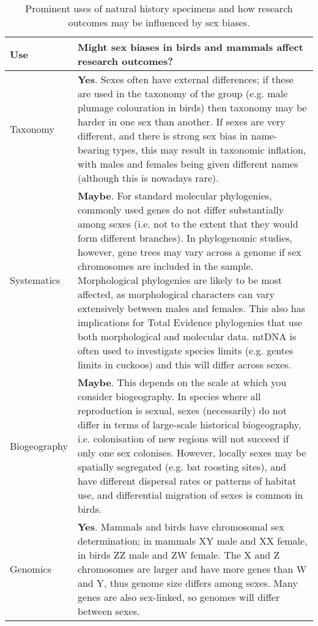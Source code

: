
\begin{longtable}{p{3cm} p{16cm}}

\caption{Prominent uses of natural history specimens and how research outcomes may be influenced by sex biases.}\\ 
  
  \hline
  \textbf{Use} & \textbf{Might sex biases in birds and mammals affect research outcomes?}\\ 

  \hline
  Taxonomy & \textbf{Yes}. Sexes often have external differences; if these are used in the taxonomy of the group (e.g. male plumage colouration in birds\cite{paxton2009utility}) then taxonomy may be harder in one sex than another. If sexes are very different, and there is strong sex bias in name-bearing types, this may result in taxonomic inflation, with males and females being given different names (although this is nowadays rare).\\ 

  Systematics & \textbf{Maybe}. For standard molecular phylogenies, commonly used genes do not differ substantially among sexes (i.e. not to the extent that they would form different branches). In phylogenomic studies, however, gene trees may vary across a genome if sex chromosomes are included in the sample\cite{reddy2017}. Morphological phylogenies are likely to be most affected, as morphological characters can vary extensively between males and females. This also has implications for Total Evidence phylogenies that use both morphological and molecular data. mtDNA is often used to investigate species limits (e.g. gentes limits in cuckoos\cite{soler2009geographic}) and this will differ across sexes.\\ 

  Biogeography & \textbf{Maybe}. This depends on the scale at which you consider biogeography. In species where all reproduction is sexual, sexes (necessarily) do not differ in terms of large-scale historical biogeography, i.e. colonisation of new regions will not succeed if only one sex colonises. However, locally sexes may be spatially segregated (e.g. bat roosting sites\cite{altringham}), and have different dispersal rates\cite{pusey1987sex} or patterns of habitat use, and differential migration of sexes is common in birds\cite{Woodworth2016}.\\ 

  Genomics & \textbf{Yes}. Mammals and birds have chromosomal sex determination; in mammals XY male and XX female, in birds ZZ male and ZW female\cite{stevens1997sex}. The X and Z chromosomes are larger and have more genes than W and Y, thus genome size differs among sexes. Many genes are also sex-linked, so genomes will differ between sexes.\\ 


\end{longtable}
